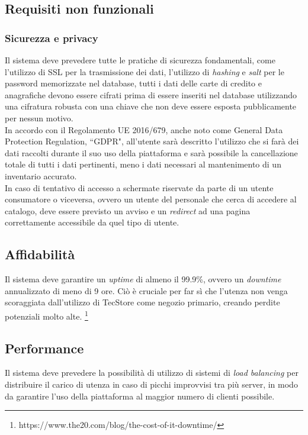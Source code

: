\documentclass[12pt,a4paper]{article}
\begin{document}
\newpage

\subsection{Requisiti non funzionali}
\subsubsection{Sicurezza e privacy}
Il sistema deve prevedere tutte le pratiche di sicurezza fondamentali, come l'utilizzo di SSL per la trasmissione dei dati, l'utilizzo di \textit{hashing} e \textit{salt} per le password memorizzate nel database, tutti i dati delle carte di credito e anagrafiche devono essere cifrati prima di essere inseriti nel database utilizzando una cifratura robusta con una chiave che non deve essere esposta pubblicamente per nessun motivo. \\
In accordo con il Regolamento UE 2016/679, anche noto come General Data Protection Regulation, ``GDPR", all'utente sarà descritto l'utilizzo che si farà dei dati raccolti durante il suo uso della piattaforma e sarà possibile la cancellazione totale di tutti i dati pertinenti, meno i dati necessari al mantenimento di un inventario accurato. \\
In caso di tentativo di accesso a schermate riservate da parte di un utente consumatore o viceversa, ovvero un utente del personale che cerca di accedere al catalogo, deve essere previsto un avviso e un \textit{redirect} ad una pagina correttamente accessibile da quel tipo di utente.

\subsection{Affidabilità}
Il sistema deve garantire un \emph{uptime} di almeno il 99.9\%, ovvero un \textit{downtime} annualizzato di meno di 9 ore. Ciò è cruciale per far sì che l'utenza non venga scoraggiata dall'utilizzo di TecStore come negozio primario, creando perdite potenziali molto alte. \footnote{https://www.the20.com/blog/the-cost-of-it-downtime/}

\subsection{Performance}
Il sistema deve prevedere la possibilità di utilizzo di sistemi di \textit{load balancing} per distribuire il carico di utenza in caso di picchi improvvisi tra più server, in modo da garantire l'uso della piattaforma al maggior numero di clienti possibile.
\end{document}
